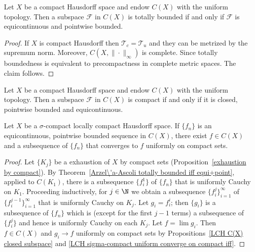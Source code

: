 \begin{theorem}\label{Arzel\'a-Ascoli totally bounded iff equi+point}
Let $X$ be a compact Hausdorff space and endow $C(X)$ with the uniform topology. Then a subspace $\mathscr{F}$ in $C(X)$ is totally bounded if and only if $\mathscr{F}$ is equicontinuous and pointwise bounded.
\end{theorem}
\begin{proof}
If $X$ is compact Hausdorff then $\mathcal{T}_c=\mathcal{T}_u$ and they can be metrized by the supremum norm. Moreover, $C(X,\|\cdot\|_\infty)$ is complete. Since totally boundedness is equivalent to precompactness in complete metric spaces. The claim follows.
\end{proof}
\begin{corollary}\label{Arzela-Ascoli compact iff}
Let $X$ be a compact Hausdorff space and endow $C(X)$ with the uniform topology. Then a subspace $\mathscr{F}$ in $C(X)$ is compact if and only if it is closed, pointwise bounded and equicontinuous.
\end{corollary}
\begin{proposition}\label{Arzela-Ascoli convergent subsequence}
Let $X$ be a $\sigma$-compact locally compact Hausdorff space. If $\{f_n\}$ is an equicontinuous, pointwise bounded sequence in $C(X)$, there exist $f\in C(X)$ and a subsequence of $\{f_n\}$ that converges to $f$ uniformly on compact sets.
\end{proposition}
\begin{proof}
Let $\{K_j\}$ be a exhaustion of $X$ by compact sets (Proposition~\ref{exhaustion by compact}). By Theorem~\ref{Arzel\'a-Ascoli totally bounded iff equi+point}, applied to $C(K_1)$, there is a subsequence $\{f_i^1\}$ of $\{f_n\}$ that is uniformly Cauchy on $K_1$. Proceeding inductively, for $j\in\N$ we obtain a subsequence $\{f_i^j\}_{i=1}^{\infty}$ of $\{f_i^{j-1}\}_{i=1}^{\infty}$ that is uniformly Cauchy on $K_j$. Let $g_i=f_i^i$; then $\{g_i\}$ is a subsequence of $\{f_n\}$ which is (except for the first $j-1$ terms) a subsequence of $\{f_i^j\}$ and hence is uniformly Cauchy on each $K_j$. Let $f=\lim g_i$. Then $f\in C(X)$ and $g_i\to f$ uniformly on compact sets by Propositions~\ref{LCH C(X) closed subspace} and \ref{LCH sigma-compact uniform converge on compact iff}.
\end{proof}
